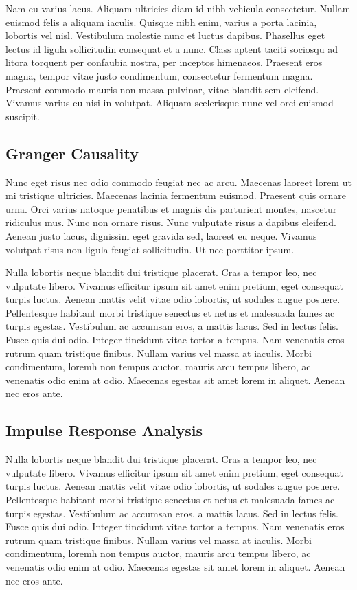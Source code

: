 \documentclass{article}
\begin{document}
Nam eu varius lacus. Aliquam ultricies diam id nibh vehicula
consectetur. Nullam euismod felis a aliquam iaculis. Quisque nibh enim,
varius a porta lacinia, lobortis vel nisl. Vestibulum molestie nunc et
luctus dapibus. Phasellus eget lectus id ligula sollicitudin consequat
et a nunc. Class aptent taciti sociosqu ad litora torquent per confaubia
nostra, per inceptos himenaeos. Praesent eros magna, tempor vitae justo
condimentum, consectetur fermentum magna. Praesent commodo mauris non
massa pulvinar, vitae blandit sem eleifend. Vivamus varius eu nisi in
volutpat. Aliquam scelerisque nunc vel orci euismod suscipit.

\hypertarget{granger-causality}{%
\subsection{Granger Causality}\label{granger-causality}}

Nunc eget risus nec odio commodo feugiat nec ac arcu. Maecenas laoreet
lorem ut mi tristique ultricies. Maecenas lacinia fermentum euismod.
Praesent quis ornare urna. Orci varius natoque penatibus et magnis dis
parturient montes, nascetur ridiculus mus. Nunc non ornare risus. Nunc
vulputate risus a dapibus eleifend. Aenean justo lacus, dignissim eget
gravida sed, laoreet eu neque. Vivamus volutpat risus non ligula feugiat
sollicitudin. Ut nec porttitor ipsum.

Nulla lobortis neque blandit dui tristique placerat. Cras a tempor leo,
nec vulputate libero. Vivamus efficitur ipsum sit amet enim pretium,
eget consequat turpis luctus. Aenean mattis velit vitae odio lobortis,
ut sodales augue posuere. Pellentesque habitant morbi tristique senectus
et netus et malesuada fames ac turpis egestas. Vestibulum ac accumsan
eros, a mattis lacus. Sed in lectus felis. Fusce quis dui odio. Integer
tincidunt vitae tortor a tempus. Nam venenatis eros rutrum quam
tristique finibus. Nullam varius vel massa at iaculis. Morbi
condimentum, loremh non tempus auctor, mauris arcu tempus libero, ac
venenatis odio enim at odio. Maecenas egestas sit amet lorem in aliquet.
Aenean nec eros ante.

\hypertarget{impulse-response-analysis}{%
\subsection{Impulse Response Analysis}\label{impulse-response-analysis}}

Nulla lobortis neque blandit dui tristique placerat. Cras a tempor leo,
nec vulputate libero. Vivamus efficitur ipsum sit amet enim pretium,
eget consequat turpis luctus. Aenean mattis velit vitae odio lobortis,
ut sodales augue posuere. Pellentesque habitant morbi tristique senectus
et netus et malesuada fames ac turpis egestas. Vestibulum ac accumsan
eros, a mattis lacus. Sed in lectus felis. Fusce quis dui odio. Integer
tincidunt vitae tortor a tempus. Nam venenatis eros rutrum quam
tristique finibus. Nullam varius vel massa at iaculis. Morbi
condimentum, loremh non tempus auctor, mauris arcu tempus libero, ac
venenatis odio enim at odio. Maecenas egestas sit amet lorem in aliquet.
Aenean nec eros ante.
\end{document}
